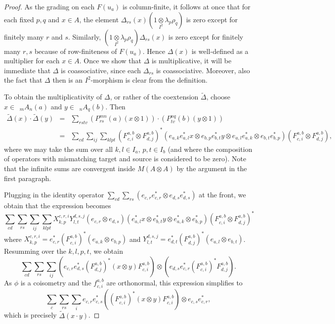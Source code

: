 \documentclass[12pt]{article}
\theoremstyle{change}
\newcommand{\Grd}[3]{\;{}_{\;#2}#1_{#3}}
\newcommand{\itimes}{\underset{I^2}{\otimes}}
\newcommand{\wDelta}{\widetilde{\Delta}}
\theoremstyle{definition}
\numberwithin{equation}{section}
\begin{document}
\begin{proof} As the grading on each $F(u_a)$ is column-finite, it follows at once that for each fixed $p,q$ and $x\in A$, the element $\Delta_{rs}(x)(1\itimes \lambda_p\rho_q)$ is zero except for finitely many $r$ and $s$. Similarly, $(1\itimes \lambda_p\rho_q)\Delta_{rs}(x)$ is zero except for finitely many $r,s$ because of row-finiteness of $F(u_a)$. Hence $\Delta(x)$ is well-defined as a multiplier for each $x\in A$. Once we show that $\Delta$ is multiplicative, it will be immediate that $\Delta$ is coassociative, since each $\Delta_{rs}$ is coassociative. Moreover, also the fact that $\Delta$ then is an $I^2$-morphism is clear from the definition.

To obtain the multiplicativity of $\Delta$, or rather of the coextension $\widetilde{\Delta}$, choose $x\in \Grd{A}{m}{n}(a)$ and $y\in \Grd{A}{n}{q}(b)$. Then \begin{eqnarray*}\wDelta(x)\cdot\wDelta(y) &=& \sum_{rstv}\left(P^{mn}_{rs}(a)(x\otimes 1)\right)\cdot \left(P^{nq}_{tv}(b)(y\otimes 1)\right)\\ &=& \sum_{cd}\sum_{ij}\sum_{klpt} \left(F_{c,i}^{a,b}\otimes F_{d,j}^{a,b}\right)^*\left(e_{a,k}e_{a,l}^*x\otimes e_{b,p}e_{b,t}^*y\otimes e_{a,l}e_{a,k}^*\otimes e_{b,t}e_{b,p}^*\right)\left(F_{c,i}^{a,b}\otimes F_{d,j}^{a,b}\right),\end{eqnarray*} where we may take the sum over all $k,l\in I_a$, $p,t\in I_b$ (and where the composition of operators with mismatching target and source is considered to be zero). Note that the infinite sums are convergent inside $M(A\otimes A)$ by the argument in the first paragraph.

Plugging in the identity operator $\sum_{cd}\sum_{rs} \left(e_{c,r}e_{c,r}^*\otimes e_{d,s}e_{d,s}^*\right)$ at the front, we obtain that the expression becomes \[ \sum_{cd}\sum_{rs}\sum_{ij}\sum_{klpt} X^{c,r,i}_{k,p}Y^{d,s,j}_{l,t}(e_{c,r}\otimes e_{d,s})\left(e_{a,l}^*x\otimes e_{b,t}^*y\otimes e_{a,k}^*\otimes e_{b,p}^*\right)\left(F_{c,i}^{a,b}\otimes F_{d,j}^{a,b}\right)^*\] where $X^{c,r,i}_{k,p} = e_{c,r}^*(F_{c,i}^{a,b})^*(e_{a,k}\otimes e_{b,p})$ and $Y^{d,s,j}_{l,t} = e_{d,t}^*(F_{d,j}^{a,b})^*(e_{a,l}\otimes e_{b,t})$. Resumming over the $k,l,p,t$, we obtain \[\sum_{cd}\sum_{rs}\sum_{ij} \left(e_{c,r}e_{d,s}^* (F_{d,j}^{a,b})^*(x\otimes y)F_{c,i}^{a,b}\right)\otimes \left(e_{d,s}e_{c,r}^* (F_{c,i}^{a,b})^*F_{d,j}^{a,b}\right).\] As $\phi$ is a coisometry and the $f_{c,i}^{a,b}$ are orthonormal, this expression simplifies to \[\sum_{c}\sum_{rs}\sum_{i}e_{c,r}e_{c,s}^* \left((F_{c,i}^{a,b})^*(x\otimes y)F_{c,i}^{a,b}\right)\otimes e_{c,s}e_{c,r}^*,\] which is precisely $\widetilde{\Delta}(x\cdot y)$.
\end{proof}
\end{document}
